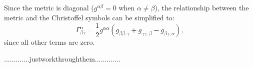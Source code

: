 \documentclass[a4paper]{article}
\begin{document}
\subsection{}
Since the metric is diagonal ($g^{\alpha \beta} = 0$ when $\alpha \ne \beta$), the relationship between the metric and the Christoffel symbols can be simplified to:
$$\Gamma^\alpha_{\beta \gamma} = \frac{1}{2} g^{\alpha \alpha}(g_{\beta \beta , \gamma} + g_{\gamma \gamma , \beta} - g_{\beta \gamma , \alpha}), $$
since all other terms are zero.

.............justworkthroughthem.............



%         
%         

% 
\end{document}
